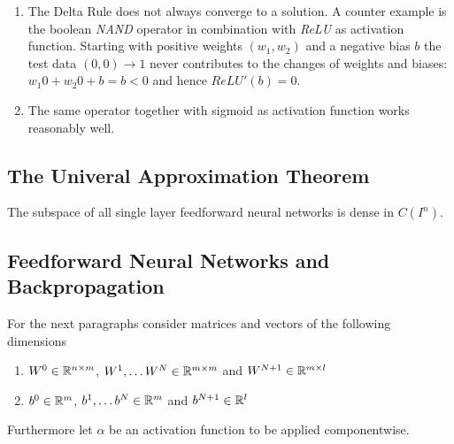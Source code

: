 \inputminted[fontsize=\small, framesep=0.35cm, frame=lines, python3=true]{python}{notebook/neural_network/delta_rule.py}
\bigskip


\begin{examples}
    \hfill
    \begin{enumerate}
        \item The Delta Rule does not always converge to a solution. A counter example is the boolean \emph{NAND}
              operator in combination with \emph{ReLU} as activation function. Starting with positive weights
              \( (w_1, w_2) \) and a negative bias \( b \) the test data \( (0, 0) \to 1 \)
              never contributes to the changes of weights and biases: \( w_1 0 + w_2 0 + b = b < 0 \) and
              hence \( ReLU'(b) = 0 \).
        \item The same operator together with sigmoid as activation function works reasonably well.
    \end{enumerate}
\end{examples}
\bigskip


\subsection{The Univeral Approximation Theorem}
\bigskip

\begin{theorem}\label{thm:universal_approximation}
    The subspace of all single layer feedforward neural networks is dense in \( C(I^n) \).
\end{theorem}
\bigskip


\subsection{Feedforward Neural Networks and Backpropagation}

For the next paragraphs consider matrices and vectors of the following dimensions
\begin{enumerate}
    \item \( W^0 \in \mathbb{R}^{n \times{} m} \), \( W^1, \dots W^N \in \mathbb{R}^{m \times{} m} \) and \( W^{N + 1} \in \mathbb{R}^{m \times l} \)
    \item \( b^0 \in \mathbb{R}^m \), \( b^1, \dots b^N \in \mathbb{R}^m \) and \( b^{N + 1} \in \mathbb{R}^l \)
\end{enumerate}
Furthermore let \( \alpha \) be an activation function to be applied componentwise.
\bigskip

